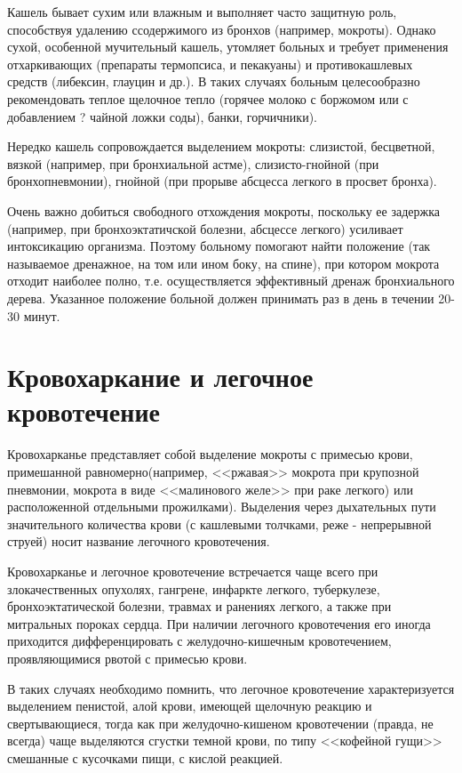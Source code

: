 \documentclass[a4paper,14pt]{extreport}
\begin{document}
Кашель бывает сухим или влажным и выполняет часто защитную роль, способствуя удалению ссодержимого из бронхов (например, мокроты). Однако сухой, особенной мучительный кашель, утомляет больных и требует применения отхаркивающих (препараты термопсиса, и пекакуаны) и противокашлевых средств (либексин, глауцин и др.). В таких случаях больным целесообразно рекомендовать теплое щелочное тепло (горячее молоко с боржомом или с добавлением ? чайной ложки соды), банки, горчичники).

Нередко кашель сопровождается выделением мокроты: слизистой, бесцветной, вязкой (например, при бронхиальной астме), слизисто-гнойной (при бронхопневмонии), гнойной (при прорыве абсцесса легкого в просвет бронха).

Очень важно добиться свободного отхождения мокроты, поскольку ее задержка (например, при бронхоэктатичской болезни, абсцессе легкого) усиливает интоксикацию организма. Поэтому больному помогают найти положение (так называемое дренажное, на том или ином боку, на спине), при котором мокрота отходит наиболее полно, т.е. осуществляется эффективный дренаж бронхиального дерева. Указанное положение больной должен принимать раз в день в течении 20-30 минут.

\section{Кровохаркание и легочное кровотечение}
Кровохарканье представляет собой выделение мокроты с примесью крови, примешанной равномерно(например, <<ржавая>> мокрота при крупозной пневмонии, мокрота в виде <<малинового желе>> при раке легкого) или расположенной отдельными прожилками).
Выделения через дыхательных пути значительного количества крови (с кашлевыми толчками, реже - непрерывной струей) носит название легочного кровотечения.

Кровохарканье и легочное кровотечение встречается чаще всего при злокачественных опухолях, гангрене, инфаркте легкого, туберкулезе, бронхоэктатической болезни, травмах и ранениях легкого, а также при митральных пороках сердца.
При наличии легочного кровотечения его иногда приходится дифференцировать с желудочно-кишечным кровотечением, проявляющимися рвотой с примесью крови. 

В таких случаях необходимо помнить, что легочное кровотечение характеризуется выделением пенистой, алой крови, имеющей щелочную реакцию и свертывающиеся, тогда как при желудочно-кишеном кровотечении (правда, не всегда) чаще выделяются сгустки темной крови, по типу <<кофейной гущи>> смешанные с кусочками пищи, с кислой реакцией.
\end{document}
